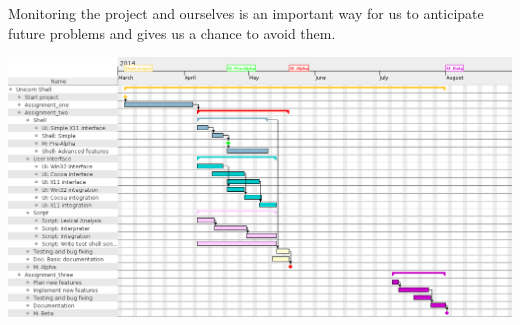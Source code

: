 \documentclass[a4paper,12pt]{article}
\begin{document}
Monitoring the project and ourselves is an important way for us to anticipate future problems and gives us a chance to avoid them.

\begin{center}
  \includegraphics[width=18cm]{gantt.png}\\
\end{center}
\end{document}
